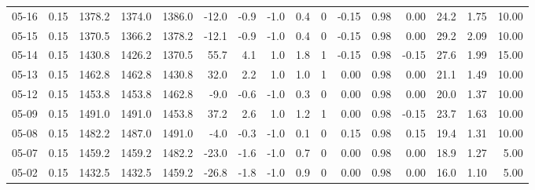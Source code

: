 \begin{threeparttable}
{\begin{tabular}{lrrrrrrrrrrrrrrr}
  05-16 &     0.15 & 1378.2 & 1374.0 & 1386.0 &      -12.0 &           -0.9 &                     -1.0 &                 0.4 &              0 &      -0.15 &      0.98 &           0.00 &             24.2 &            1.75 &                  10.00 \\
  05-15 &     0.15 & 1370.5 & 1366.2 & 1378.2 &      -12.1 &           -0.9 &                     -1.0 &                 0.4 &              0 &      -0.15 &      0.98 &           0.00 &             29.2 &            2.09 &                  10.00 \\
  05-14 &     0.15 & 1430.8 & 1426.2 & 1370.5 &       55.7 &            4.1 &                      1.0 &                 1.8 &              1 &      -0.15 &      0.98 &          -0.15 &             27.6 &            1.99 &                  15.00 \\
  05-13 &     0.15 & 1462.8 & 1462.8 & 1430.8 &       32.0 &            2.2 &                      1.0 &                 1.0 &              1 &       0.00 &      0.98 &           0.00 &             21.1 &            1.49 &                  10.00 \\
  05-12 &     0.15 & 1453.8 & 1453.8 & 1462.8 &       -9.0 &           -0.6 &                     -1.0 &                 0.3 &              0 &       0.00 &      0.98 &           0.00 &             20.0 &            1.37 &                  10.00 \\
  05-09 &     0.15 & 1491.0 & 1491.0 & 1453.8 &       37.2 &            2.6 &                      1.0 &                 1.2 &              1 &       0.00 &      0.98 &          -0.15 &             23.7 &            1.63 &                  10.00 \\
  05-08 &     0.15 & 1482.2 & 1487.0 & 1491.0 &       -4.0 &           -0.3 &                     -1.0 &                 0.1 &              0 &       0.15 &      0.98 &           0.15 &             19.4 &            1.31 &                  10.00 \\
  05-07 &     0.15 & 1459.2 & 1459.2 & 1482.2 &      -23.0 &           -1.6 &                     -1.0 &                 0.7 &              0 &       0.00 &      0.98 &           0.00 &             18.9 &            1.27 &                   5.00 \\
  05-02 &     0.15 & 1432.5 & 1432.5 & 1459.2 &      -26.8 &           -1.8 &                     -1.0 &                 0.9 &              0 &       0.00 &      0.98 &           0.00 &             16.0 &            1.10 &                   5.00 \\

\end{tabular}}
\end{threeparttable}

